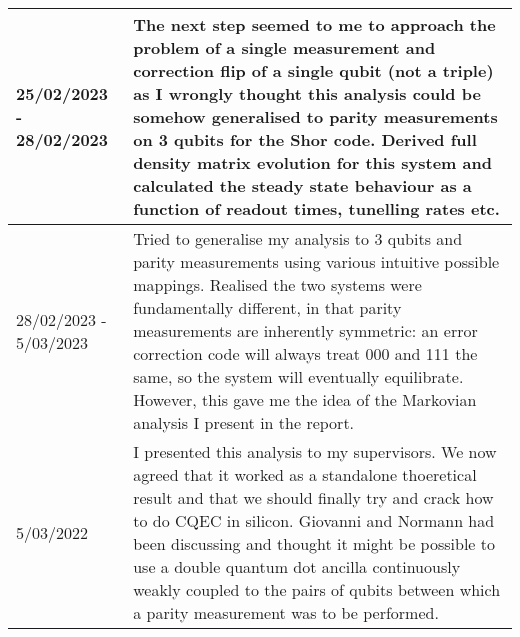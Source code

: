 \documentclass{article}
\begin{document}
\begin{table}
\begin{tabular}{|p{2cm}|p{10cm}|}
    \hline 25/02/2023 - 28/02/2023&
    The next step seemed to me to approach the problem of a single measurement and correction flip of a single qubit (not a triple) as I wrongly thought this analysis could be somehow generalised to parity measurements on 3 qubits for the Shor code. Derived full density matrix evolution for this system and calculated the steady state behaviour as a function of readout times, tunelling rates etc. \\
    \hline 28/02/2023 - 5/03/2023& Tried to generalise my analysis to 3 qubits and parity measurements using various intuitive possible mappings. Realised the two systems were fundamentally different, in that parity measurements are inherently symmetric: an error correction code will always treat 000 and 111 the same, so the system will eventually equilibrate. However, this gave me the idea of the Markovian analysis I present in the report. \\
    \hline 5/03/2022&I presented this analysis to my supervisors. We now agreed that it worked as a standalone thoeretical result and that we should finally try and crack how to do CQEC in silicon. Giovanni and Normann had been discussing and thought it might be possible to use a double quantum dot ancilla continuously weakly coupled to the pairs of qubits between which a parity measurement was to be performed. \\



    
\end{tabular}
\end{table}
\end{document}
